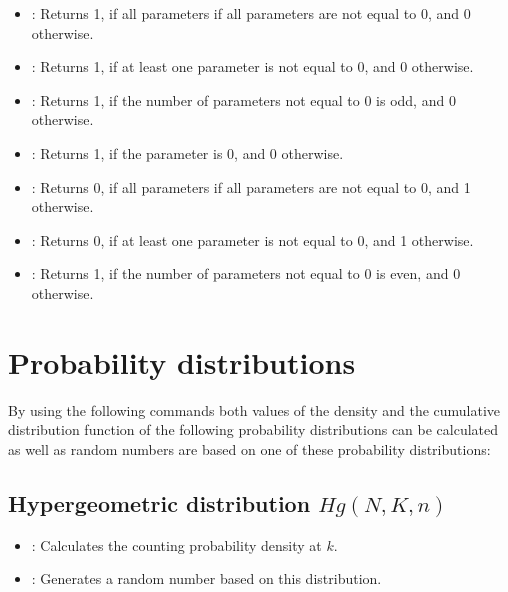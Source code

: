 \begin{itemize}

\item
{}:
Returns 1, if all parameters if all parameters are not equal to 0, and 0 otherwise.

\item
{}:
Returns 1, if at least one parameter is not equal to 0, and 0 otherwise.

\item
{}:
Returns 1, if the number of parameters not equal to 0 is odd, and 0 otherwise.

\item
{}:
Returns 1, if the parameter is 0, and 0 otherwise.

\item
{}:
Returns 0, if all parameters if all parameters are not equal to 0, and 1 otherwise.

\item
{}:
Returns 0, if at least one parameter is not equal to 0, and 1 otherwise.

\item
{}:
Returns 1, if the number of parameters not equal to 0 is even, and 0 otherwise.

\end{itemize}



\chapter{Probability distributions}\label{sec:Wahrscheinlichkeitsverteilungen}

By using the following commands both values of the density and the cumulative distribution function
of the following probability distributions can be calculated as well as random numbers are based on
one of these probability distributions:



\section{Hypergeometric distribution \texorpdfstring{$Hg(N,K,n)$}{Hg(N,K,n)}}

\begin{itemize}

\item
{}:
Calculates the counting probability density at $k$.

\item
{}:
Generates a random number based on this distribution.

\end{itemize}



